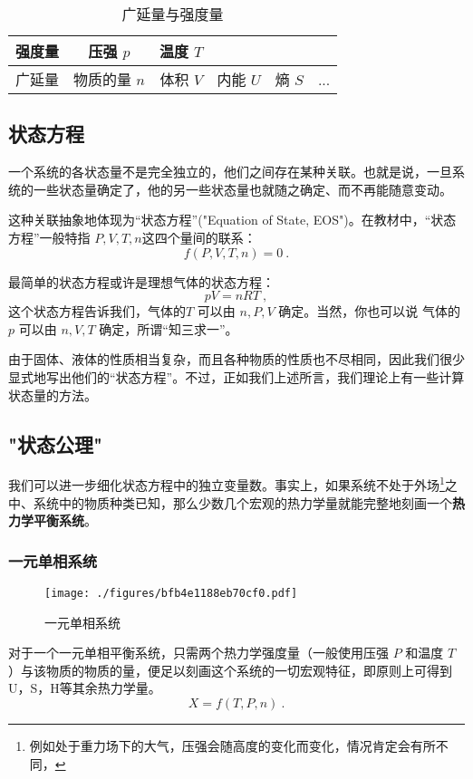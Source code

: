 \begin{table}[ht]
\centering
\caption{广延量与强度量}\label{tab_statef_1}
\begin{tabular}{|c|c|c|c|c|c|}
\hline
强度量 & 压强 $p$ & 温度 $T$ & & & \\
\hline
广延量 & 物质的量 $n$ & 体积 $V$ & 内能 $U$& 熵 $S$ & ...   \\
\hline
\end{tabular}
\end{table}


\subsection{状态方程}
一个系统的各状态量不是完全独立的，他们之间存在某种关联。也就是说，一旦系统的一些状态量确定了，他的另一些状态量也就随之确定、而不再能随意变动。

这种关联抽象地体现为“状态方程”("Equation of State, EOS")。在教材中，“状态方程”一般特指 $P, V, T, n$这四个量间的联系：
$$
f(P, V, T, n) = 0~.
$$

最简单的状态方程或许是理想气体的状态方程：
$$pV = nRT~,$$
这个状态方程告诉我们，气体的$T$ 可以由 $n, P,V$ 确定。当然，你也可以说 气体的$p$ 可以由 $n, V,T$ 确定，所谓“知三求一”。

由于固体、液体的性质相当复杂，而且各种物质的性质也不尽相同，因此我们很少显式地写出他们的“状态方程”。不过，正如我们上述所言，我们理论上有一些计算状态量的方法。

\subsection{"状态公理"}
我们可以进一步细化状态方程中的独立变量数。事实上，如果系统不处于外场\footnote{例如处于重力场下的大气，压强会随高度的变化而变化，情况肯定会有所不同，}之中、系统中的物质种类已知，那么少数几个宏观的热力学量就能完整地刻画一个\textbf{热力学平衡系统}。

\subsubsection{一元单相系统}
\begin{figure}[ht]
\centering
\texttt{[image: ./figures/bfb4e1188eb70cf0.pdf]}
\caption{一元单相系统} \label{fig_statef_1}
\end{figure}
对于一个一元单相平衡系统，只需两个热力学强度量（一般使用压强 $P$ 和温度 $T$ ）与该物质的物质的量，便足以刻画这个系统的一切宏观特征，即原则上可得到U，S，H等其余热力学量。
\begin{equation}
X=f(T,P,n)~.
\end{equation}

